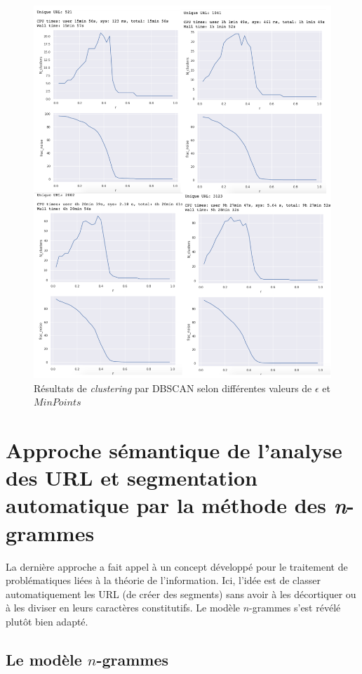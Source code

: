 \documentclass[11pt, a4paper]{article}
\begin{document}
\begin{figure}[!h]
	\center
	\includegraphics[scale=0.1]{clustering.png}
	\caption{Résultats de \textit{clustering} par DBSCAN selon différentes valeurs de $\epsilon$ et $MinPoints$}
	\label{clustering}
\end{figure}

\section{Approche sémantique de l'analyse des URL et segmentation automatique par la méthode des \textit{n}-grammes}

La dernière approche a fait appel à un concept développé pour le traitement de problématiques liées à la théorie de l'information. Ici, l'idée est de classer automatiquement les URL (de créer des segments) sans avoir à les décortiquer ou à les diviser en leurs caractères constitutifs. Le modèle $n$-grammes s'est révélé plutôt bien adapté.

\subsection{Le modèle $n$-grammes}
\end{document}
